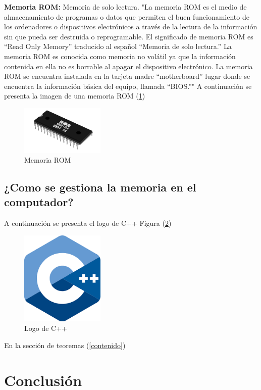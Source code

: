 \documentclass{article}
\begin{document}
\newline
\textbf{Memoria ROM:} Memoria de solo lectura.
\newline
\newline
"La memoria ROM es el medio de almacenamiento de programas o datos que permiten el buen funcionamiento de los ordenadores o dispositivos electrónicos a través de la lectura de la información sin que pueda ser destruida o reprogramable. El significado de memoria ROM es “Read Only Memory” traducido al español “Memoria de solo lectura.”
\newline
La memoria ROM es conocida como memoria no volátil ya que la información contenida en ella no es borrable al apagar el dispositivo electrónico.
\newline
La memoria ROM se encuentra instalada en la tarjeta madre “motherboard” lugar donde se encuentra la información básica del equipo, llamada “BIOS.”"\cite{ROM}
\newline
\newline
A continuación se presenta la imagen de una memoria ROM (\ref{fig:memoria-ROM})
\begin{figure}[h]
\includegraphics[width=4cm]{memoria-ROM.jpg}\centering
\caption{Memoria ROM}
\label{fig:memoria-ROM}
\end{figure}


\subsection{¿Como se gestiona la memoria en el computador?}

A continuación se presenta el logo de C++ Figura (\ref{fig:cpplogo})

\begin{figure}[h]
\includegraphics[width=4cm]{cpplogo.png}
\centering
\caption{Logo de C++}
\label{fig:cpplogo}
\end{figure}

En la sección de teoremas (\ref{contenido})

\section{Conclusión} \label{conclulsion}



\end{document}
